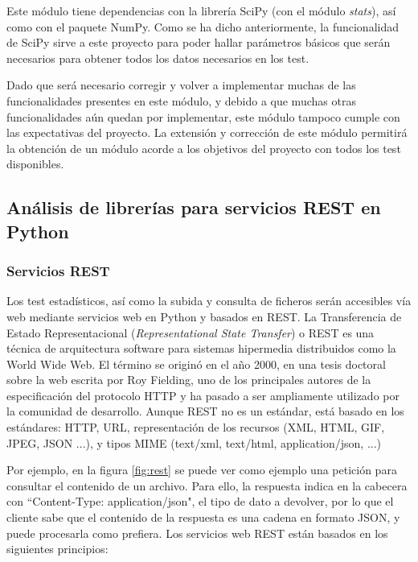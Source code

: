 Este módulo tiene dependencias con la librería SciPy (con el módulo \textit{stats}), así como con el paquete NumPy. Como se ha dicho anteriormente, la funcionalidad de SciPy sirve a este proyecto para poder hallar parámetros básicos que serán necesarios para obtener todos los datos necesarios en los test.

Dado que será necesario corregir y volver a implementar muchas de las funcionalidades presentes en este módulo, y debido a que muchas otras funcionalidades aún quedan por implementar, este módulo tampoco cumple con las expectativas del proyecto. La extensión y corrección de este módulo permitirá la obtención de un módulo acorde a los objetivos del proyecto con todos los test disponibles. 

\subsection{Análisis de librerías para servicios REST en Python} \label{bottle}

\subsubsection{\textbf{Servicios REST}}
Los test estadísticos, así como la subida y consulta de ficheros serán accesibles vía web mediante servicios web en Python y basados en REST. La Transferencia de Estado Representacional (\textit{Representational State Transfer}) o REST es una técnica de arquitectura software para sistemas hipermedia distribuidos como la World Wide Web. El término se originó en el año 2000, en una tesis doctoral sobre la web escrita por Roy Fielding, uno de los principales autores de la especificación del protocolo HTTP y ha pasado a ser ampliamente utilizado por la comunidad de desarrollo. Aunque REST no es un estándar, está basado en los estándares: HTTP, URL, representación de los recursos (XML, HTML, GIF, JPEG, JSON ...), y tipos MIME (text/xml, text/html, application/json, ...)

Por ejemplo, en la figura \ref{fig:rest} se puede ver como ejemplo una petición para consultar el contenido de un archivo. Para ello, la respuesta indica en la cabecera con ``Content-Type: application/json", el tipo de dato a devolver, por lo que el cliente sabe que el contenido de la respuesta es una cadena en formato JSON, y puede procesarla como prefiera. Los servicios web REST están basados en los siguientes principios:


